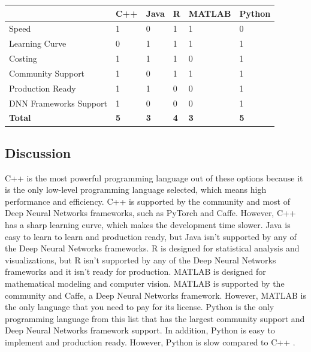 \documentclass[onecolumn, draftclsnofoot,10pt, compsoc]{IEEEtran}
\begin{document}
\begin{center}
\begin{tabular}{|l|l|l|l|l|l|}
\hline
           & \textbf{C++} & \textbf{Java} & \textbf{R} & \textbf{MATLAB} & \textbf{Python}\\ \hline
Speed &     1      &      0     &      1     &      1     & 0          \\ \hline
Learning Curve &     0      &     1      &      1     &     1      &    1       \\ \hline
Costing &     1      &     1      &     1      &    0       &       1    \\ \hline
Community Support &      1     &     0      &   1        &      1     &     1      \\ \hline
Production Ready &     1      &     1      &    0       &       0    &      1     \\ \hline
DNN Frameworks Support &     1      &      0     &     0      &        0   &   1        \\ \hline
\textbf{Total} &      \textbf{5}     &   \textbf{3}        &      \textbf{4}     &     \textbf{3}      &    \textbf{5}       \\ \hline
\end{tabular}
\end{center}

\subsection{Discussion}

C++ is the most powerful programming language out of these options because it is the only low-level programming language selected, which means high performance and efficiency. C++ is supported by the community and most of Deep Neural Networks frameworks, such as PyTorch and Caffe. However, C++ has a sharp learning curve, which makes the development time slower. Java is easy to learn to learn and production ready, but Java isn't supported by any of the Deep Neural Networks frameworks. R is designed for statistical analysis and visualizations, but R isn't supported by any of the Deep Neural Networks frameworks and it isn't ready for production. MATLAB is designed for mathematical modeling and computer vision. MATLAB is supported by the community and Caffe, a Deep Neural Networks framework. However, MATLAB is the only language that you need to pay for its license. Python is the only programming language from this list that has the largest community support and Deep Neural Networks framework support. In addition, Python is easy to implement and production ready. However, Python is slow compared to C++ \cite{pl2}\cite{pl3}.
\end{document}
